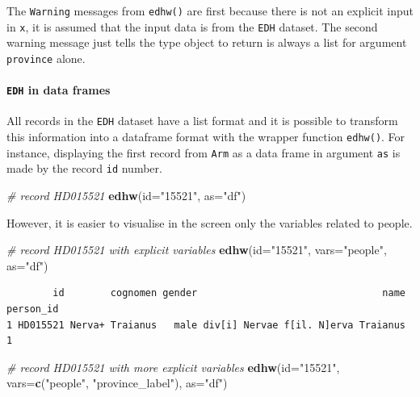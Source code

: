 \documentclass[a4paper,11pt]{memoir}
\newenvironment{Shaded}{\begin{snugshade}}{\end{snugshade}}
\newcommand{\CommentTok}[1]{\textcolor[rgb]{0.56,0.35,0.01}{\textit{#1}}}
\newcommand{\DataTypeTok}[1]{\textcolor[rgb]{0.13,0.29,0.53}{#1}}
\newcommand{\KeywordTok}[1]{\textcolor[rgb]{0.13,0.29,0.53}{\textbf{#1}}}
\newcommand{\NormalTok}[1]{#1}
\newcommand{\StringTok}[1]{\textcolor[rgb]{0.31,0.60,0.02}{#1}}
\let\oldparagraph\paragraph
\renewcommand{\paragraph}[1]{\oldparagraph{#1}\mbox{}}
\begin{document}
The \texttt{Warning} messages from \texttt{edhw()} are first because
there is not an explicit input in \texttt{x}, it is assumed that the
input data is from the \texttt{EDH} dataset. The second warning message
just tells the type object to return is always a list for argument
\texttt{province} alone.

\hypertarget{edh-in-data-frames}{%
\paragraph{\texorpdfstring{\texttt{EDH} in data
frames}{EDH in data frames}}\label{edh-in-data-frames}}

All records in the \texttt{EDH} dataset have a list format and it is
possible to transform this information into a dataframe format with the
wrapper function \texttt{edhw()}. For instance, displaying the first
record from \texttt{Arm} as a data frame in argument
\texttt{\textquotesingle{}as\textquotesingle{}} is made by the record
\texttt{\textquotesingle{}id\textquotesingle{}} number.

\begin{Shaded}
\begin{Highlighting}[]
\CommentTok{# record HD015521}
\KeywordTok{edhw}\NormalTok{(}\DataTypeTok{id=}\StringTok{"15521"}\NormalTok{, }\DataTypeTok{as=}\StringTok{"df"}\NormalTok{)}
\end{Highlighting}
\end{Shaded}

However, it is easier to visualise in the screen only the variables
related to people.

\begin{Shaded}
\begin{Highlighting}[]
\CommentTok{# record HD015521 with explicit variables}
\KeywordTok{edhw}\NormalTok{(}\DataTypeTok{id=}\StringTok{"15521"}\NormalTok{, }\DataTypeTok{vars=}\StringTok{"people"}\NormalTok{, }\DataTypeTok{as=}\StringTok{"df"}\NormalTok{)}
\end{Highlighting}
\end{Shaded}

\begin{verbatim}
        id        cognomen gender                                name person_id
1 HD015521 Nerva+ Traianus   male div[i] Nervae f[il. N]erva Traianus         1
\end{verbatim}

\begin{Shaded}
\begin{Highlighting}[]
\CommentTok{# record HD015521 with more explicit variables}
\KeywordTok{edhw}\NormalTok{(}\DataTypeTok{id=}\StringTok{"15521"}\NormalTok{, }\DataTypeTok{vars=}\KeywordTok{c}\NormalTok{(}\StringTok{"people"}\NormalTok{, }\StringTok{"province_label"}\NormalTok{), }\DataTypeTok{as=}\StringTok{"df"}\NormalTok{)}
\end{Highlighting}
\end{Shaded}
\end{document}

